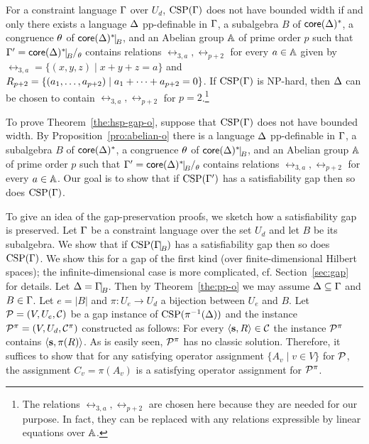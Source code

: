 \begin{prop}\label{pro:abelian-o}
For a constraint language $\Gamma$ over $U_d$, ${\rm CSP}(\Gamma)$ does not have bounded
  width if and only there exists a language $\Delta$ pp-definable in $\Gamma$, a
  subalgebra $B$ of $\mathsf{core}(\Delta)^*$, a congruence $\theta$ of $\core(\Dl)^*\red B$,
  and an Abelian group ${\mathbb A}$ of prime order $p$ such that $\Gm'=\core(\Dl)^*\red B\fac\th$ contains relations $\rel_{3,a},\rel_{p+2}$ for every $a\in{\mathbb A}$ given by $\rel_{3,a}=\{(x,y,z)\mid x+y+z=a\}$ and $R_{p+2}=\{(a _1,\ldots, a _{p+2})\mid a_1+\dots+a_{p+2}=0\}$. If ${\rm CSP}(\Gamma)$ is NP-hard, then $\Delta$ can be chosen to contain $\rel_{3,a},\rel_{p+2}$ for $p=2$.\footnote{The relations $\rel_{3,a},\rel_{p+2}$ are chosen here because they are needed for our purpose. In fact, they can be replaced with any relations expressible by linear equations over ${\mathbb A}$.}
\end{prop}

To prove Theorem~\ref{the:hsp-gap-o}, suppose that ${\rm CSP}(\Gamma)$ does not have
bounded width. 
%
By Proposition~\ref{pro:abelian-o} there is 
a language $\Delta$ pp-definable in $\Gamma$, a subalgebra $B$ of $\mathsf{core}(\Delta)^*$, a congruence
$\theta$ of $\core(\Dl)^*\red B$, and an Abelian group ${\mathbb A}$ of prime order $p$
such that $\Gm'=\core(\Dl)^*\red B\fac\th$ contains relations $\rel_{3,a},\rel_{p+2}$
for every $a\in{\mathbb A}$.
%
Our goal is to show that if ${\rm CSP}(\Gamma')$ has a satisfiability gap
then so does ${\rm CSP}(\Gamma)$. 


To give an idea of the gap-preservation proofs, we sketch how a satisfiability
gap is preserved.
%
Let $\Gamma$ be a constraint language over the set $U_d$ and let $B$ be its subalgebra.
We show that if $\CSP(\Gm\red B)$ has a satisfiability gap then so does
${\rm CSP}(\Gamma)$. We show this for a gap of the first kind (over finite-dimensional Hilbert spaces); the infinite-dimensional case is more complicated, cf. Section~\ref{sec:gap} for details.
%
Let $\Dl=\Gm\red B$. Then by Theorem~\ref{the:pp-o} we may assume $\Delta\subseteq\Gamma$ and $B\in\Gamma$. Let $e=|B|$ and $\pi:U_e\to U_d$ a bijection between $U_e$ and $B$. 
%
Let ${\mathcal P}=(V,U_e,{\mathcal C})$ be a gap instance of ${\rm CSP}(\pi^{-1}(\Delta))$ and the instance ${\mathcal P}^\pi=(V,U_d,{\mathcal C}^\pi)$ constructed as follows: For every $\langle {\bf s},R \rangle\in{\mathcal C}$ the instance ${\mathcal P}^\pi$ contains $\langle {\bf s},\pi(R) \rangle$. As is easily seen, ${\mathcal P}^\pi$ has no classic solution. Therefore, it suffices to show that for any satisfying operator assignment $\{A_v\mid v\in V\}$ for ${\mathcal P}$, the assignment $C_v=\pi(A_v)$ is a satisfying operator assignment for ${\mathcal P}^\pi$.

